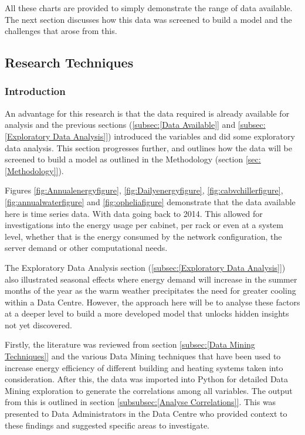 \documentclass[12pt]{scrartcl}
\begin{document}
All these charts are provided to simply demonstrate the range of data available. The next section discusses how this data was screened to build a model and the challenges that arose from this.  

\subsection{Research Techniques}
\label{subsec:[Research Techniques]}

\subsubsection{Introduction}
\label{subsubsec:[Introduction]}

An advantage for this research is that the data required is already available for analysis and the previous sections (\ref{subsec:[Data Available]} and \ref{subsec:[Exploratory Data Analysis]}) introduced the variables and did some exploratory data analysis. This section progresses further, and outlines how the data will be screened to build a model as outlined in the Methodology (section \ref{sec:[Methodology]}). 

Figures \ref{fig:Annualenergyfigure}, \ref{fig:Dailyenergyfigure}, \ref{fig:cabvchillerfigure}, \ref{fig:annualwaterfigure} and \ref{fig:opheliafigure} demonstrate that the data available here is time series data. With data going back to 2014. This allowed for investigations into the energy usage per cabinet, per rack or even at a system level, whether that is the energy consumed by the network configuration, the server demand or other computational needs. 

The Exploratory Data Analysis section (\ref{subsec:[Exploratory Data Analysis]}) also illustrated seasonal effects where energy demand will increase in the summer months of the year as the warm weather precipitates the need for greater cooling within a Data Centre. However, the approach here will be to analyse these factors at a deeper level to build a more developed  model that unlocks hidden insights not yet discovered.

Firstly, the literature was reviewed from section \ref{subsec:[Data Mining Techniques]} and the various Data Mining techniques that have been used to increase energy efficiency of different building and heating systems taken into consideration. After this, the data was imported into Python for detailed Data Mining exploration to generate the correlations among all variables. The output from this is outlined in section \ref{subsubsec:[Analyse Correlations]}. This was presented to Data Administrators in the Data Centre who provided context to these findings and suggested specific areas to investigate.   %
\end{document}
